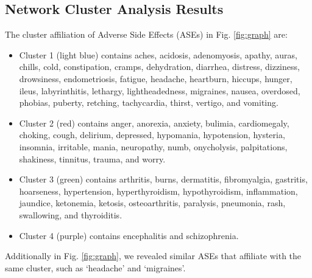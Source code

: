 \documentclass[referee,bst/sn-basic]{sn-jnl}%
\theoremstyle{thmstyletwo}%
\theoremstyle{thmstylethree}%
\begin{document}
\begin{appendices}
\section{Network Cluster Analysis Results}
\label{app2:network_cluster}
The cluster affiliation of Adverse Side Effects (ASEs) in Fig. \ref{fig:graph} are:

\begin{itemize}
    \item 
Cluster 1 (light blue) contains 
aches, acidosis, adenomyosis, apathy, auras, chills, cold, constipation, cramps, dehydration, diarrhea, distress, dizziness, drowsiness, endometriosis, fatigue, headache, heartburn, hiccups, hunger, ileus, labyrinthitis, lethargy, lightheadedness, migraines, nausea, overdosed, phobias, puberty, retching, tachycardia, thirst, vertigo, and vomiting. 
    \item 
Cluster 2 (red) contains 
anger, anorexia, anxiety, bulimia, cardiomegaly, choking, cough, delirium, depressed, hypomania, hypotension, hysteria, insomnia, irritable, mania, neuropathy, numb, onycholysis, palpitations, shakiness, tinnitus, trauma, and worry. 
    \item 
Cluster 3 (green) contains 
arthritis, burns, dermatitis, fibromyalgia, gastritis, hoarseness, hypertension, hyperthyroidism, hypothyroidism, inflammation, jaundice, ketonemia, ketosis, osteoarthritis, paralysis, pneumonia, rash, swallowing, and thyroiditis. 
    \item 
Cluster 4 (purple) contains 
encephalitis and schizophrenia.
\end{itemize}

Additionally in Fig. \ref{fig:graph}, we revealed similar ASEs that affiliate with the same cluster, such as `headache' and `migraines'.


\end{appendices}
\end{document}
